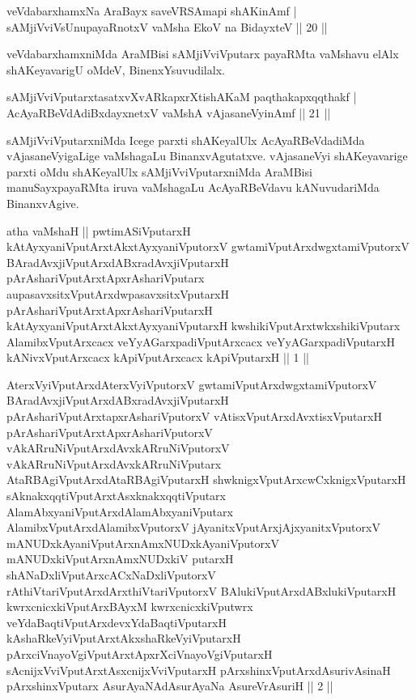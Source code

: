\begin{shl}
veVdabarxhamxNa AraBayx saveVRSAmapi shAKinAmf | \\
sAMjiVviVsUnupayaRnotxV vaMsha EkoV na BidayxteV \hfill||  20 ||  
\end{shl}

\begin{artha}
veVdabarxhamxniMda AraMBisi sAMjiVviVputarx payaRMta vaMshavu elAlx 
shAKeyavarigU oMdeV, BinenxYsuvudilalx.
\end{artha}

\begin{shl}
sAMjiVviVputarxtasatxvXvARkapxrXtishAKaM paqthakapxqqthakf | \\
AcAyaRBeVdAdiBxdayxnetxV vaMshA vAjasaneVyinAmf \hfill||  21 ||  
\end{shl}

\begin{artha}
sAMjiVviVputarxniMda Icege parxti shAKeyalUlx AcAyaRBeVdadiMda 
vAjasaneVyigaLige vaMshagaLu BinanxvAgutatxve. vAjasaneVyi 
shAKeyavarige parxti oMdu shAKeyalUlx sAMjiVviVputarxniMda 
AraMBisi manuSayxpayaRMta iruva vaMshagaLu AcAyaRBeVdavu 
kANuvudariMda BinanxvAgive.
\end{artha}


\begin{shl}
atha vaMshaH || pwtimASiVputarxH kAtAyxyaniVputArxtAkxtAyxyaniVputorxV gwtamiVputArxdwgxtamiVputorxV BAradAvxjiVputArxdABxradAvxjiVputarxH pArAshariVputArxtApxrAshariVputarx aupasavxsitxVputArxdwpasavxsitxVputarxH pArAshariVputArxtApxrAshariVputarxH kAtAyxyaniVputArxtAkxtAyxyaniVputarxH kwshikiVputArxtwkxshikiVputarx AlamibxVputArxcacx veYyAGarxpadiVputArxcacx veYyAGarxpadiVputarxH kANivxVputArxcacx kApiVputArxcacx kApiVputarxH || 1 || 
\end{shl}

\begin{shl}
AterxVyiVputArxdAterxVyiVputorxV gwtamiVputArxdwgxtamiVputorxV BAradAvxjiVputArxdABxradAvxjiVputarxH pArAshariVputArxtapxrAshariVputorxV vAtisxVputArxdAvxtisxVputarxH pArAshariVputArxtApxrAshariVputorxV vAkARruNiVputArxdAvxkARruNiVputorxV vAkARruNiVputArxdAvxkARruNiVputarx AtaRBAgiVputArxdAtaRBAgiVputarxH shwknigxVputArxcwCxknigxVputarxH sAknakxqqtiVputArxtAsxknakxqqtiVputarx AlamAbxyaniVputArxdAlamAbxyaniVputarx AlamibxVputArxdAlamibxVputorxV jAyanitxVputArxjAjxyanitxVputorxV mANUDxkAyaniVputArxnAmxNUDxkAyaniVputorxV mANUDxkiVputArxnAmxNUDxkiV putarxH shANaDxliVputArxcACxNaDxliVputorxV rAthiVtariVputArxdArxthiVtariVputorxV BAlukiVputArxdABxlukiVputarxH kwrxcnicxkiVputArxBAyxM kwrxcnicxkiVputwrx veYdaBaqtiVputArxdevxYdaBaqtiVputarxH kAshaRkeVyiVputArxtAkxshaRkeVyiVputarxH pArxciVnayoVgiVputArxtApxrXciVnayoVgiVputarxH sAcnijxVviVputArxtAsxcnijxVviVputarxH pArxshinxVputArxdAsurivAsinaH pArxshinxVputarx AsurAyaNAdAsurAyaNa AsureVrAsuriH || 2 ||
\end{shl}

